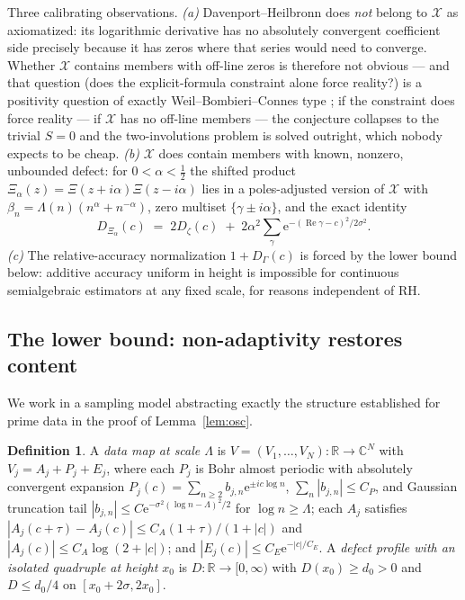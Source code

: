 \documentclass[11pt]{amsart}
\theoremstyle{plain}
\theoremstyle{definition}
\newtheorem{definition}[theorem]{Definition}
\theoremstyle{remark}
\newcommand{\CC}{\mathbb{C}}
\newcommand{\RR}{\mathbb{R}}
\newcommand{\re}{\operatorname{Re}}
\newcommand{\eE}{\mathrm{e}}
\begin{document}
Three calibrating observations. \emph{(a)} Davenport--Heilbronn does \emph{not} belong to
$\mathcal X$ as axiomatized: its logarithmic derivative has no absolutely convergent coefficient
side precisely because it has zeros where that series would need to converge. Whether $\mathcal X$
contains members with off-line zeros is therefore not obvious --- and that question (does the
explicit-formula constraint alone force reality?) is a positivity question of exactly
Weil--Bombieri--Connes type \cite{Weil1952,Bombieri2000,Connes2016}; if the constraint does force
reality --- if $\mathcal X$ has no off-line members --- the conjecture collapses to the trivial
$S=0$ and the two-involutions problem is solved outright, which nobody expects to be cheap. \emph{(b)} $\mathcal X$ does contain members with known, nonzero, unbounded
defect: for $0<\alpha<\tfrac12$ the shifted product
$\Xi_\alpha(z)=\Xi(z+i\alpha)\Xi(z-i\alpha)$ lies in a poles-adjusted version of $\mathcal X$ with
$\beta_n=\Lambda(n)(n^\alpha+n^{-\alpha})$, zero multiset $\{\gamma\pm i\alpha\}$, and the exact
identity
\begin{equation}\label{eq:shifted}
D_{\Xi_\alpha}(c)\;=\;2D_\zeta(c)\;+\;2\alpha^2\sum_\gamma\eE^{-(\re\gamma-c)^2/2\sigma^2}.
\end{equation}
\emph{(c)} The relative-accuracy normalization $1+D_\Gamma(c)$ is forced by the lower bound below:
additive accuracy uniform in height is impossible for continuous semialgebraic estimators at any
fixed scale, for reasons independent of RH.

\subsection{The lower bound: non-adaptivity restores content}

We work in a sampling model abstracting exactly the structure established for prime data in the
proof of Lemma~\ref{lem:osc}.

\begin{definition}\label{def:model}
A \emph{data map at scale $\Lambda$} is $V=(V_1,\dots,V_N):\RR\to\CC^N$ with $V_j=A_j+P_j+E_j$,
where each $P_j$ is Bohr almost periodic with absolutely convergent expansion
$P_j(c)=\sum_{n\ge2}b_{j,n}\eE^{\pm ic\log n}$, $\sum_n|b_{j,n}|\le C_P$, and Gaussian truncation
tail $|b_{j,n}|\le C\eE^{-\sigma^2(\log n-\Lambda)^2/2}$ for $\log n\ge\Lambda$; each $A_j$
satisfies $|A_j(c+\tau)-A_j(c)|\le C_A(1+\tau)/(1+|c|)$ and $|A_j(c)|\le C_A\log(2+|c|)$; and
$|E_j(c)|\le C_E\eE^{-|c|/C_E}$. A \emph{defect profile with an isolated quadruple at height
$x_0$} is $D:\RR\to[0,\infty)$ with $D(x_0)\ge d_0>0$ and $D\le d_0/4$ on $[x_0+2\sigma,2x_0]$.
\end{definition}
\end{document}
